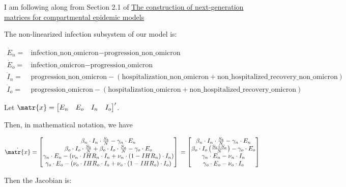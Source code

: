 \documentclass[11pt]{article}
\begin{document}
I am following along from Section 2.1 of \href{https://paperpile.com/app/p/3ac94d2d-a793-030e-b8a5-93733f228342}{The construction of next-generation matrices for compartmental epidemic models}

The non-linearized infection subsystem of our model is:

\begin{align*}
	\dot{E}_n =& \text{infection\_non\_omicron} - \text{progression\_non\_omicron}\\
	\dot{E}_o =& \text{infection\_omicron} - \text{progression\_omicron}\\
	\dot{I}_n =& \text{progression\_non\_omicron} - (\text{hospitalization\_non\_omicron} + \text{non\_hospitalized\_recovery\_non\_omicron})\\
	\dot{I}_o =& \text{progression\_omicron} - (\text{hospitalization\_omicron} + \text{non\_hospitalized\_recovery\_omicron})
\end{align*}

Let \( \matr{x} = \begin{bmatrix} E_n & E_o & I_n & I_o \end{bmatrix}^\prime \).

Then, in mathematical notation, we have

\[
	\dot{\matr{x}}	=
	\begin{bmatrix}
		\beta_n \cdot I_n \cdot \frac{S_b}{N} - \gamma_n \cdot E_n\\
		\beta_o \cdot I_o \cdot \frac{S_b}{N} + \beta_o \cdot I_o \cdot \frac{S_o}{N} - \gamma_o \cdot E_o\\
		\gamma_n \cdot E_n - (\nu_n \cdot IHR_n \cdot I_n + \nu_n \cdot (1 - IHR_n) \cdot I_n)\\
		\gamma_o \cdot E_o - (\nu_o \cdot IHR_o \cdot I_o + \nu_o \cdot (1 - IHR_o) \cdot I_o)
	 \end{bmatrix}\\
	 =
	 \begin{bmatrix}
	 	\beta_n \cdot I_n \cdot \frac{S_b}{N} - \gamma_n \cdot E_n\\
		\beta_o \cdot I_o \left( \frac{S_b + S_o}{N} \right) - \gamma_o \cdot E_o\\
		\gamma_n \cdot E_n - \nu_n \cdot I_n\\
		\gamma_o \cdot E_o - \nu_o \cdot I_o
	 \end{bmatrix}
\]

Then the Jacobian is:
\end{document}
